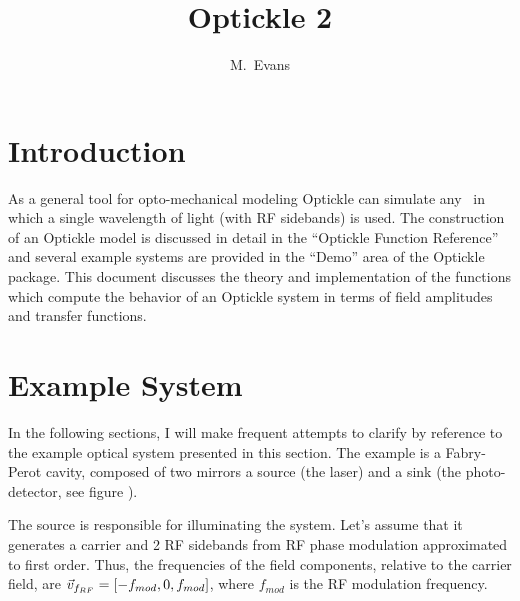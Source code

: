 \documentclass[12pt]{article}
\title{Optickle 2}
\author{M.~Evans}
\begin{document}
\maketitle


\section{Introduction}

As a general tool for opto-mechanical modeling Optickle can simulate any \ifo\ in which a
 single wavelength of light (with RF sidebands) is used.
The construction of an Optickle model is discussed in detail in the ``Optickle Function Reference''
 and several example systems are provided in the ``Demo'' area of the Optickle package.
This document discusses the theory and implementation of the functions which
 compute the behavior of an Optickle system in terms of field amplitudes and transfer functions.

\section{Example System}

In the following sections, I will make frequent attempts to clarify by reference to the example optical system presented in this section.
The example is a Fabry-Perot cavity, composed of two mirrors a source (the laser) and a sink (the photo-detector, see figure ).


The source is responsible for illuminating the system.
Let's assume that it generates a carrier and 2 RF sidebands from RF phase modulation approximated to first order.
Thus, the frequencies of the field components, relative to the carrier field, are $\vec{v}_{f_{RF}} = \left[ -f_{mod},0,f_{mod} \right]$, where $f_{mod}$ is the RF modulation frequency.
\end{document}

